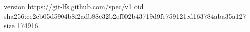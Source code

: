 version https://git-lfs.github.com/spec/v1
oid sha256:ce2cb05d5904b8f2adb88e32b2ef002b43719d9fe759121cd163784aba35a127
size 174916
